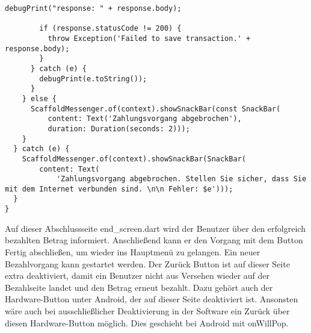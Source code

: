 \begin{lstlisting}[caption={Durchführung des Bezahlvorganges}]
        debugPrint("response: " + response.body);

        if (response.statusCode != 200) {
          throw Exception('Failed to save transaction.' + response.body);
        }
      } catch (e) {
        debugPrint(e.toString());
      }
    } else {
      ScaffoldMessenger.of(context).showSnackBar(const SnackBar(
          content: Text('Zahlungsvorgang abgebrochen'),
          duration: Duration(seconds: 2)));
    }
  } catch (e) {
    ScaffoldMessenger.of(context).showSnackBar(SnackBar(
        content: Text(
            'Zahlungsvorgang abgebrochen. Stellen Sie sicher, dass Sie mit dem Internet verbunden sind. \n\n Fehler: $e')));
  }
}
\end{lstlisting}

Auf dieser Abschlussseite \glqq end\_screen.dart\grqq{} wird der Benutzer über den erfolgreich bezahlten Betrag informiert.
Anschließend kann er den Vorgang mit dem Button \glqq Fertig\grqq{} abschließen, um wieder ins Hauptmenü zu gelangen.
Ein neuer Bezahlvorgang kann gestartet werden.
Der \glqq Zurück\grqq{} Button ist auf dieser Seite extra deaktiviert, damit ein Benutzer nicht aus Versehen wieder auf der Bezahlseite landet und den Betrag erneut bezahlt.
Dazu gehört auch der Hardware-Button unter Android, der auf dieser Seite deaktiviert ist.
Ansonsten wäre auch bei ausschließlicher Deaktivierung in der Software ein Zurück über diesen Hardware-Button möglich.
Dies geschieht bei Android mit \glqq onWillPop\grqq{}.

